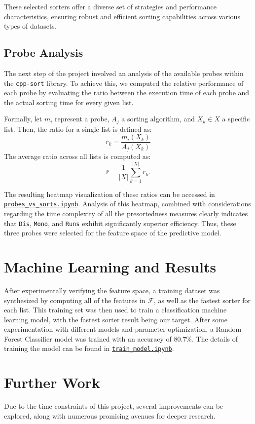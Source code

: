 \documentclass[twocolumn]{article}
\begin{document}
These selected sorters offer a diverse set of strategies and performance characteristics, ensuring robust and efficient sorting capabilities across various types of datasets.

\subsection{Probe Analysis}
The next step of the project involved an analysis of the available probes within the \texttt{cpp-sort} library. To achieve this, we computed the relative performance of each probe by evaluating the ratio between the execution time of each probe and the actual sorting time for every given list.

Formally, let $m_i$ represent a probe, $A_j$ a sorting algorithm, and $X_k \in X$ a specific list. Then, the ratio for a single list is defined as:
\[
    r_k = \frac{m_i(X_k)}{A_j(X_k)}
\]
The average ratio across all lists is computed as:
\[
    \bar{r} = \frac{1}{|X|}\sum_{k=1}^{|X|} r_k.
\]

The resulting heatmap visualization of these ratios can be accessed in \href{https://github.com/kiselevart/sorting-selector/blob/main/Implementation/analysis/probes_vs_sorts.ipynb}{\texttt{probes\_vs\_sorts.ipynb}}. Analysis of this heatmap, combined with considerations regarding the time complexity of all the presortedness measures clearly indicates that \texttt{Dis}, \texttt{Mono}, and \texttt{Runs} exhibit significantly superior efficiency. Thus, these three probes were selected for the feature space of the predictive model.

\section{Machine Learning and Results}
After experimentally verifying the feature space, a training dataset was synthesized by computing all of the features in $\mathcal{F}$, as well as the fastest sorter for each list. This training set was then used to train a classification machine learning model, with the fastest sorter result being our target. After some experimentation with different models and parameter optimization, a Random Forest Classifier\cite{breiman2001random} model was trained with an accuracy of $80.7\%$. The details of training the model can be found in \href{https://github.com/kiselevart/sorting-selector/blob/main/Implementation/analysis/train_model.ipynb}{\texttt{train\_model.ipynb}}. 

\section{Further Work}
Due to the time constraints of this project, several improvements can be explored, along with numerous promising avenues for deeper research.
\end{document}

